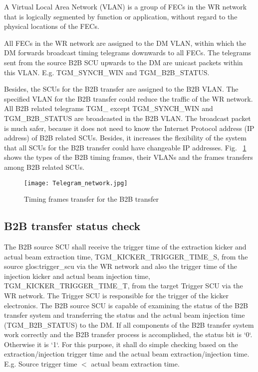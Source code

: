 A Virtual Local Area Network (VLAN) is a group of FECs in the WR network that is logically segmented by function or application, without regard to the physical locations of the FECs. 

All FECs in the WR network are assigned to the DM VLAN, within which the DM forwards broadcast timing telegrams downwards to all FECs. The telegrams sent from the source B2B SCU upwards to the DM are unicast packets within this VLAN. E.g. TGM\_SYNCH\_WIN and TGM\_B2B\_STATUS. 

Besides, the SCUs for the B2B transfer are assigned to the B2B \gls{VLAN}. The specified VLAN for the B2B transfer could reduce the traffic of the WR network. All B2B related telegrams TGM\_ except TGM\_SYNCH\_WIN and TGM\_B2B\_STATUS are broadcasted in the B2B VLAN. The broadcast packet is much safer, because it does not need to know the Internet Protocol address (\gls{IP} address) of B2B related SCUs. Besides, it increases the flexibility of the system that all SCUs for the B2B transfer could have changeable IP addresses. Fig. ~\ref{Telegram_network} shows the types of the B2B timing frames, their VLANs and the frames transfers among B2B related SCUs.
\begin{landscape}
\begin{figure}[!htb]
   \centering   
   \texttt{[image: Telegram\_network.jpg]}
   \caption{Timing frames transfer for the B2B transfer}
   \label{Telegram_network}
\end{figure}  
\end{landscape}

\subsection{B2B transfer status check}
The B2B source SCU shall receive the trigger time of the extraction kicker and actual beam extraction time, TGM\_KICKER\_TRIGGER\_TIME\_S, from the source \gls{glos:trigger_scu} via the WR network and also the trigger time of the injection kicker and actual beam injection time, TGM\_KICKER\_TRIGGER\_TIME\_T, from the target Trigger SCU via the WR network. The Trigger SCU is responsible for the trigger of the kicker electronics. The B2B source SCU is capable of examining the status of the B2B transfer system and transferring the status and the actual beam injection time  (TGM\_B2B\_STATUS) to the DM. If all components of the B2B transfer system work correctly and the B2B transfer process is accomplished, the status bit is `0`. Otherwise it is `1`. For this purpose, it shall do simple checking based on the extraction/injection trigger time and the actual beam extraction/injection time. E.g. Source trigger time $<$ actual beam extraction time.
